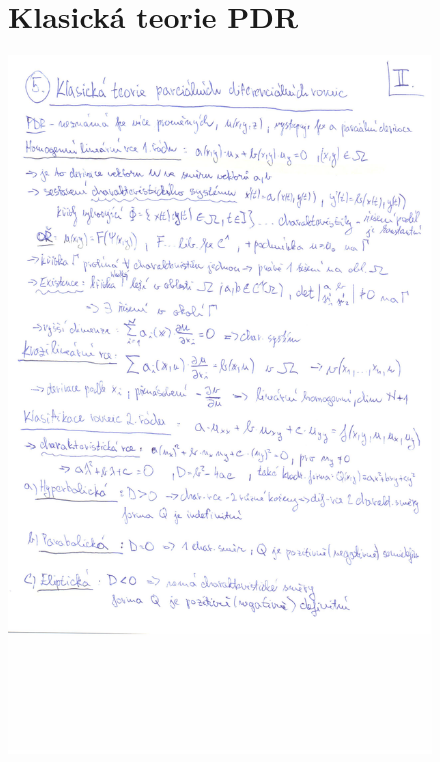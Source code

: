 \begin{figure}[H]
\section{Klasická teorie PDR}
\includegraphics[width=\textwidth]{Obrazky/2-5a.jpg}
\end{figure}

